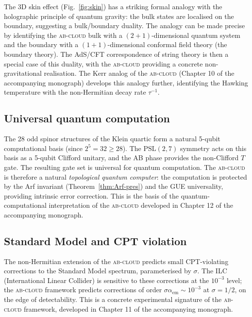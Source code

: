 \documentclass[11pt,a4paper]{article}
\theoremstyle{plain}
\theoremstyle{definition}
\theoremstyle{remark}
\newcommand{\Abcloud}{\textsc{ab-cloud}}
\begin{document}
The 3D skin effect (Fig.~\ref{fig:skin}) has a striking formal analogy with the holographic principle of quantum gravity: the bulk states are localised on the boundary, suggesting a bulk/boundary duality. The analogy can be made precise by identifying the \Abcloud{} bulk with a $(2+1)$-dimensional quantum system and the boundary with a $(1+1)$-dimensional conformal field theory (the boundary theory). The AdS/CFT correspondence of string theory is then a special case of this duality, with the \Abcloud{} providing a concrete non-gravitational realisation. The Kerr analog of the \Abcloud{} (Chapter 10 of the accompanying monograph) develops this analogy further, identifying the Hawking temperature with the non-Hermitian decay rate $\tau^{-1}$.

\subsection{Universal quantum computation}

The 28 odd spinor structures of the Klein quartic form a natural 5-qubit computational basis (since $2^5 = 32 \ge 28$). The $\mathrm{PSL}(2,7)$ symmetry acts on this basis as a 5-qubit Clifford unitary, and the AB phase provides the non-Clifford $T$ gate. The resulting gate set is universal for quantum computation. The \Abcloud{} is therefore a natural \emph{topological quantum computer}: the computation is protected by the Arf invariant (Theorem~\ref{thm:Arf-pres}) and the GUE universality, providing intrinsic error correction. This is the basis of the quantum-computational interpretation of the \Abcloud{} developed in Chapter 12 of the accompanying monograph.

\subsection{Standard Model and CPT violation}

The non-Hermitian extension of the \Abcloud{} predicts small CPT-violating corrections to the Standard Model spectrum, parameterised by $\sigma$. The ILC (International Linear Collider) is sensitive to these corrections at the $10^{-3}$ level; the \Abcloud{} framework predicts corrections of order $\sigma\alpha_{\mathrm{em}}\sim 10^{-3}$ at $\sigma = 1/2$, on the edge of detectability. This is a concrete experimental signature of the \Abcloud{} framework, developed in Chapter 11 of the accompanying monograph.

\end{document}
